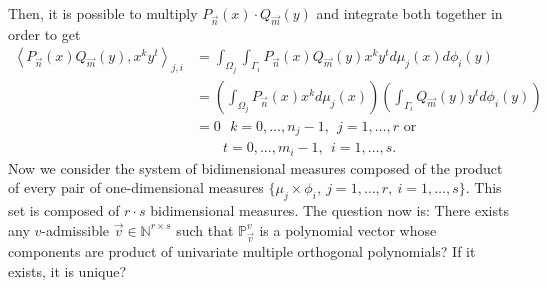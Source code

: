 \documentclass[12pt,a4]{report}
\theoremstyle{plain}
\newcommand{\N}[0]{\mathbb{N}}
\newcommand{\prodesc}[2]{\left\langle #1 , #2 \right\rangle}
\begin{document}
  Then, it is possible to multiply $P_{\vec n}(x)\cdot Q_{\vec m}(y)$ and integrate both together in order to get
  \begin{equation}
    \label{eq:product-of-univariate-mop}
    \begin{split}
        \prodesc{P_{\vec n}(x)Q_{\vec m}(y)}{x^k y^t}_{j,i} &= \int_{\Omega_j}\int_{\Gamma_i} P_{\vec n}(x)Q_{\vec m}(y)x^k y^t d\mu_j(x) d\phi_i(y) \\
        &= \left(\int_{\Omega_j}P_{\vec n}(x)x^k d\mu_j(x) \right)\left(\int_{\Gamma_i} Q_{\vec m}(y) y^t  d\phi_i(y)\right) \\
        &= 0 \ \ \ 
            k = 0,\dots,n_j-1, \ \ j=1,\dots,r \text{ or } \\
        &\ \ \ \ \ \ \ \ \
            t = 0,\dots,m_i-1, \ \ i=1,\dots,s.
    \end{split}
  \end{equation}
  Now we consider the system of bidimensional measures composed of the product of every pair of one-dimensional measures $\{\mu_j\times \phi_i, \ j=1,\dots,r, \ i=1,\dots,s\}$. This set is composed of $r\cdot s$ bidimensional measures. The question now is: There exists any $v$-admissible $\vec v\in\N^{r\times s}$ such that $\mathbb P_{\vec v}^v$ is a polynomial vector whose components are product of univariate multiple orthogonal polynomials? If it exists, it is unique?
\end{document}
